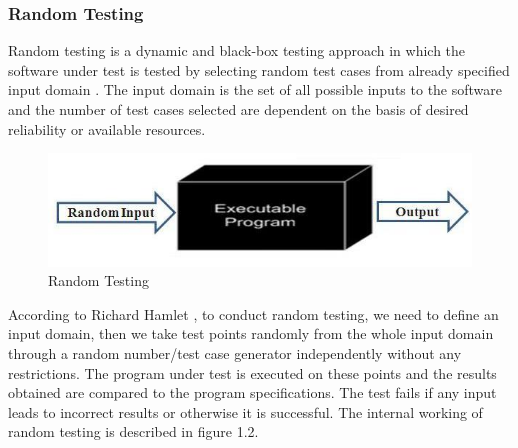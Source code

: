
\subsubsection{Random Testing}
Random testing is a dynamic and black-box testing approach in which the software under test is tested by selecting random test cases from already specified input domain \cite{Chan2002}. The input domain is the set of all possible inputs to the software and the number of test cases selected are dependent on the basis of desired reliability or available resources.

\begin{figure}[h]
	\centering
	\includegraphics[scale=0.5]{Literature/figure1.jpg}
	\caption{Random Testing}
  
\end{figure}

According to Richard Hamlet \cite{Hamlet1994}, to conduct random testing, we need to define an input domain, then we take test points randomly from the whole input domain through a random number/test case generator independently without any restrictions. The program under test is executed on these points and the results obtained are compared to the program specifications. The test fails if any input leads to incorrect results or otherwise it is successful. The internal working of random testing is described in figure 1.2.


